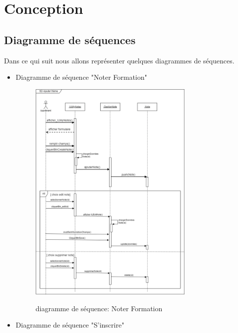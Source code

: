 \section{Conception}
\subsection{Diagramme de séquences}
Dans ce qui suit nous allons représenter quelques diagrammes de séquences.

\begin{itemize}
	\item Diagramme de séquence "Noter Formation"
	
	
	\begin{figure}[!h]
		\centering
		{\includegraphics[width=0.75\textwidth]{D) IMAGES/diagseqchap5.png}}
		\caption{diagramme de séquence: Noter Formation}
		\label{Diagramme3}
	\end{figure}
\newpage
\item Diagramme de séquence "S'inscrire"


\end{itemize}
